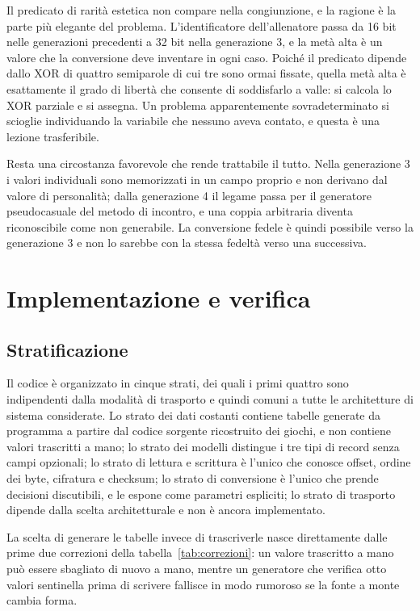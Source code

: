 \documentclass[11pt,a4paper]{article}
\begin{document}
Il predicato di rarità estetica non compare nella congiunzione, e la ragione è la parte più elegante del problema. L'identificatore dell'allenatore passa da 16 bit nelle generazioni precedenti a 32 bit nella generazione 3, e la metà alta è un valore che la conversione deve inventare in ogni caso. Poiché il predicato dipende dallo XOR di quattro semiparole di cui tre sono ormai fissate, quella metà alta è esattamente il grado di libertà che consente di soddisfarlo a valle: si calcola lo XOR parziale e si assegna. Un problema apparentemente sovradeterminato si scioglie individuando la variabile che nessuno aveva contato, e questa è una lezione trasferibile.

Resta una circostanza favorevole che rende trattabile il tutto. Nella generazione 3 i valori individuali sono memorizzati in un campo proprio e non derivano dal valore di personalità; dalla generazione 4 il legame passa per il generatore pseudocasuale del metodo di incontro, e una coppia arbitraria diventa riconoscibile come non generabile. La conversione fedele è quindi possibile verso la generazione 3 e non lo sarebbe con la stessa fedeltà verso una successiva.

\section{Implementazione e verifica}

\subsection{Stratificazione}

Il codice è organizzato in cinque strati, dei quali i primi quattro sono indipendenti dalla modalità di trasporto e quindi comuni a tutte le architetture di sistema considerate. Lo strato dei dati costanti contiene tabelle generate da programma a partire dal codice sorgente ricostruito dei giochi, e non contiene valori trascritti a mano; lo strato dei modelli distingue i tre tipi di record senza campi opzionali; lo strato di lettura e scrittura è l'unico che conosce offset, ordine dei byte, cifratura e checksum; lo strato di conversione è l'unico che prende decisioni discutibili, e le espone come parametri espliciti; lo strato di trasporto dipende dalla scelta architetturale e non è ancora implementato.

La scelta di generare le tabelle invece di trascriverle nasce direttamente dalle prime due correzioni della tabella~\ref{tab:correzioni}: un valore trascritto a mano può essere sbagliato di nuovo a mano, mentre un generatore che verifica otto valori sentinella prima di scrivere fallisce in modo rumoroso se la fonte a monte cambia forma.
\end{document}
